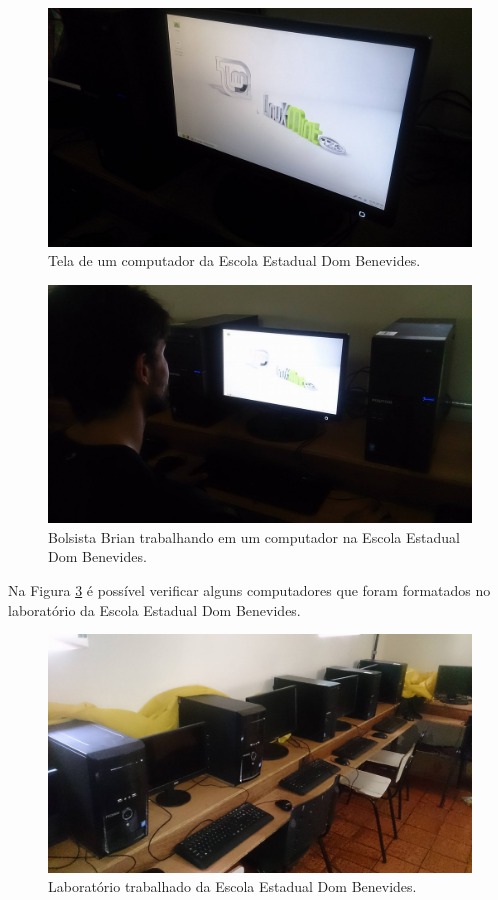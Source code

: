 \documentclass[
	12pt,				%
	openright,			%
	oneside,			%
	a4paper,			%
	english,			%
	spanish,			%
	brazil,				%
	]{abntex2}
\begin{document}
\begin{figure}[H]
	\centering
	\includegraphics[scale=0.2]{figuras/cris01.jpg}
	\caption{Tela de um computador da Escola Estadual Dom Benevides.}
	\label{fig:tela1}
\end{figure}

\begin{figure}[H]
	\centering
	\includegraphics[scale=0.2]{figuras/cris02.jpg}
	\caption{Bolsista Brian trabalhando em um computador na Escola Estadual Dom Benevides.}
	\label{fig:tela2}
\end{figure}

Na Figura \ref{fig:tela3} é possível verificar alguns computadores que foram formatados no laboratório da Escola Estadual Dom Benevides.

\begin{figure}[H]
	\centering
	\includegraphics[scale=0.2]{figuras/cris03.jpg}
	\caption{Laboratório trabalhado da Escola Estadual Dom Benevides.}
	\label{fig:tela3}
\end{figure}
\end{document}
